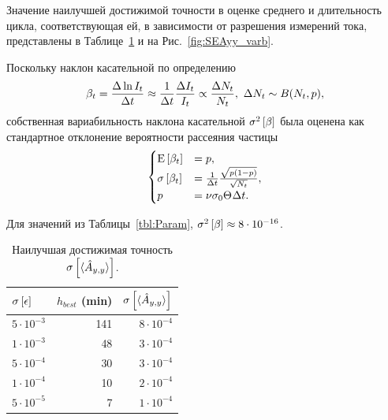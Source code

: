\documentclass{article}
\begin{document}
	Значение наилучшей достижимой точности в оценке среднего и длительность цикла, соответствующая ей, в зависимости от разрешения измерений тока, представлены в Таблице~\ref{tbl:SEAyy_varb} и на Рис.~\ref{fig:SEAyy_varb}. 
		
	Поскольку наклон касательной по определению
	\[
	\slp[t] = \frac{\Delta \ln I_t}{\Delta t} \approx \frac{1}{\Delta t}\frac{\Delta I_t}{I_t} \propto \frac{\Delta N_t}{N_t}, ~\Delta N_t \sim B(N_t, p),
	\]
	собственная вариабильность наклона касательной $\v{\slp}$ была оценена как стандартное отклонение вероятности рассеяния частицы 
	\begin{equation*}
	\begin{cases}
	\Xpct{\slp[t]} 	&= p, \\
	\SE{\slp[t]}		&= \frac{1}{\Delta t}\frac{\sqrt{p(1-p)}}{\sqrt{N_t}}, \\
	p 				&= \nu\CS[0]\Thick\Delta t.
	\end{cases}
	\end{equation*}
	
	Для значений из Таблицы~\ref{tbl:Param}, $\v{\slp} \approx 8\cdot 10^{-16}$.
	
	\begin{table}[h]
		\centering
		\caption{Наилучшая достижимая точность $\SE{\avg{\Ayy*}}$.\label{tbl:SEAyy_varb}}
		\begin{tabular}{lrr}
			\hline\hline
			$\SE{\err}$			&	$h_{best}$ (min)	& $\SE{\avg{\Ayy*}}$\\
			\hline
			$5\cdot10^{-3}$		&	141					& $8\cdot10^{-4}$\\
			$1\cdot10^{-3}$		&	48					& $3\cdot10^{-4}$\\
			$5\cdot10^{-4}$		&	30					& $3\cdot10^{-4}$\\
			$1\cdot10^{-4}$		&	10					& $2\cdot10^{-4}$\\
			$5\cdot10^{-5}$		&	7					& $1\cdot10^{-4}$\\
			\hline
		\end{tabular}
	\end{table}
\end{document}
